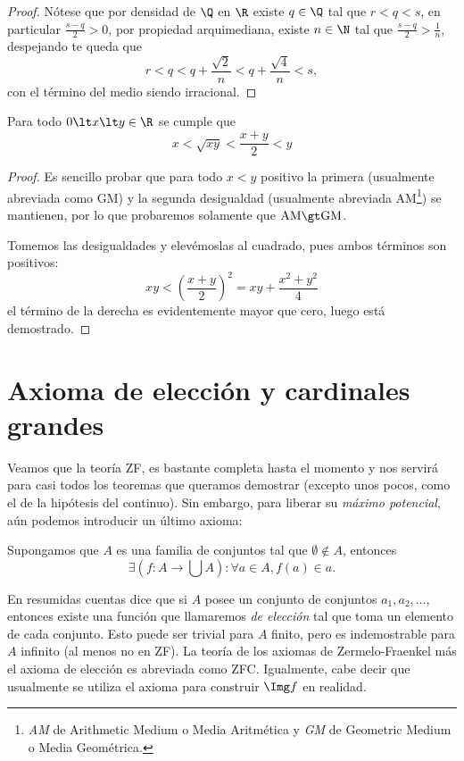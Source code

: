 \documentclass[11pt,oneside,a4paper]{book}
\begin{document}
\begin{proof}
Nótese que por densidad de $\Q$ en $\R$ existe $q\in\Q$ tal que $r\lt q\lt s$, en particular $\frac{s-q}{2}\gt 0$, por propiedad arquimediana, existe $n\in\N$ tal que $\frac{s-q}{2}\gt\frac{1}{n}$, despejando te queda que
$$r\lt q\lt q+\frac{\sqrt{2}}{n}\lt q+\frac{\sqrt{4}}{n}\lt s,$$
con el término del medio siendo irracional.
\end{proof}
\begin{thm}
Para todo $0\lt x\lt y\in\R$ se cumple que
$$x\lt\sqrt{xy}\lt\frac{x+y}{2}\lt y$$
\end{thm}
\begin{proof}
Es sencillo probar que para todo $x\lt y$ positivo la primera (usualmente abreviada como GM) y la segunda desigualdad (usualmente abreviada AM\footnote{\textit{AM} de Arithmetic Medium o Media Aritmética y \textit{GM} de Geometric Medium o Media Geométrica.}) se mantienen, por lo que probaremos solamente que $\rm AM\gt GM$.

Tomemos las desigualdades y elevémoslas al cuadrado, pues ambos términos son positivos:
$$xy\lt\left(\frac{x+y}{2}\right)^2=xy+\frac{x^2+y^2}{4}$$
el término de la derecha es evidentemente mayor que cero, luego está demostrado.
\end{proof}

\section{Axioma de elección y cardinales grandes}\label{sec:big-cardinals}
Veamos que la teoría ZF, es bastante completa hasta el momento y nos servirá para casi todos los teoremas que queramos demostrar (excepto unos pocos, como el de la hipótesis del continuo). Sin embargo, para liberar su \textit{máximo potencial}, aún podemos introducir un último axioma:
\begin{axiom}[de Elección (AC)]
Supongamos que $A$ es una familia de conjuntos tal que $\emptyset\notin A$, entonces
$$\exists(f:A\rightarrow\bigcup A):\forall a\in A, f(a)\in a.$$
\end{axiom}
En resumidas cuentas dice que si $A$ posee un conjunto de conjuntos $a_1,a_2,\dots$, entonces existe una función que llamaremos \textit{de elección} tal que toma un elemento de cada conjunto. Esto puede ser trivial para $A$ finito, pero es indemostrable para $A$ infinito (al menos no en ZF). La teoría de los axiomas de Zermelo-Fraenkel más el axioma de elección es abreviada como ZFC. Igualmente, cabe decir que usualmente se utiliza el axioma para construir $\Img f$ en realidad.
\end{document}
